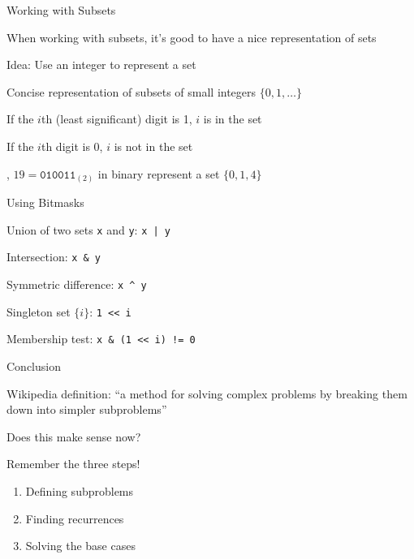 \documentclass[13pt,onlymath]{beamer}
\begin{document}
\begin{frame}{Working with Subsets}
\BIT
\item When working with subsets, it's good to have a nice representation of sets
\item Idea: Use an integer to represent a set
\BIT
\item Concise representation of subsets of small integers $\{0, 1, \ldots\}$
\item If the $i$th (least significant) digit is 1, $i$ is in the set
\item If the $i$th digit is 0, $i$ is not in the set
\item \eg, $19 = \mathtt{010011}_{(2)}$ in binary represent a set $\{0, 1, 4\}$
\EIT
\EIT
\end{frame}

\begin{frame}[fragile]{Using Bitmasks}
\BIT
\item Union of two sets \verb,x, and \verb,y,: \verb,x | y,
\item Intersection: \verb,x & y,
\item Symmetric difference: \verb,x ^ y,
\item Singleton set $\{i\}$: \verb,1 << i,
\item Membership test: \verb,x & (1 << i) != 0,
\EIT
\end{frame}

\begin{frame}{Conclusion}
\BIT
\item Wikipedia definition: ``a method for solving complex problems by breaking them down into simpler subproblems''
\BIT
\item Does this make sense now?
\EIT
\vfill
\item Remember the three steps!
\begin{enumerate}
\item Defining subproblems
\item Finding recurrences
\item Solving the base cases
\end{enumerate}
\EIT
\end{frame}
\end{document}
